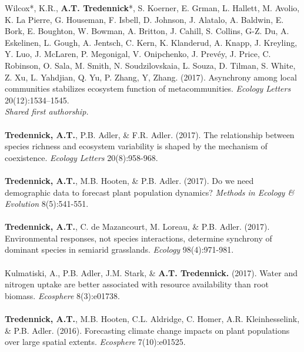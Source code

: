 

\begin{pubentries}
\begin{\small}
Wilcox*, K.R., {\bf{A.T. Tredennick}}*, S. Koerner, E. Grman, L. Hallett, M. Avolio, K. La Pierre, G. Houseman, F. Isbell, D. Johnson, J. Alatalo, A. Baldwin, E. Bork, E. Boughton, W. Bowman, A. Britton, J. Cahill, S. Collins, G-Z. Du, A. Eskelinen, L. Gough, A. Jentsch, C. Kern, K. Klanderud, A. Knapp, J. Kreyling, Y. Luo, J. McLaren, P. Megonigal, V. Onipchenko, J. Prevéy, J. Price, C. Robinson, O. Sala, M. Smith, N. Soudzilovskaia, L. Souza, D. Tilman, S. White, Z. Xu, L. Yahdjian, Q. Yu, P. Zhang, Y, Zhang. (2017). Asynchrony among local communities stabilizes ecosystem function of metacommunities. \emph{Ecology Letters} 20(12):1534–1545.\\
{\footnotesize*{\emph{Shared first authorship.}}}\\
\\
{\bf{Tredennick, A.T.}}, P.B. Adler, \& F.R. Adler. (2017). The relationship between species richness and ecosystem variability is shaped by the mechanism of coexistence. \emph{Ecology Letters} 20(8):958-968. \\
\\
{\bf{Tredennick, A.T.}}, M.B. Hooten, \& P.B. Adler. (2017). Do we need demographic data to forecast plant population dynamics? \emph{Methods in Ecology \& Evolution} 8(5):541-551.\\
\\
{\bf{Tredennick, A.T.}}, C. de Mazancourt, M. Loreau, \& P.B. Adler. (2017). Environmental responses, not species interactions, determine synchrony of dominant species in semiarid grasslands. \emph{Ecology} 98(4):971-981.\\
\\
Kulmatiski, A., P.B. Adler, J.M. Stark, \& {\bf{A.T. Tredennick.}} (2017). Water and nitrogen uptake are better associated with resource availability than root biomass. \emph{Ecosphere} 8(3):e01738.\\
\\
{\bf{Tredennick, A.T.}}, M.B. Hooten, C.L. Aldridge, C. Homer, A.R. Kleinhesselink, \& P.B. Adler. (2016). Forecasting climate change impacts on plant populations over large spatial extents. \emph{Ecosphere} 7(10):e01525.\\

\end{\small}
\end{pubentries}
